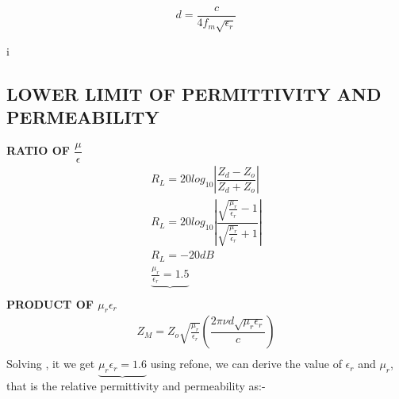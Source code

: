 \documentclass[journal]{IEEEtran}
\begin{document}
\begin{equation} \label{nine}
d  = \dfrac{c}{4 f_m \sqrt{\epsilon_r}} 
\end{equation}

i%


\subsection{LOWER LIMIT OF  PERMITTIVITY AND PERMEABILITY}

\textbf{RATIO OF $\dfrac{\mu}{\epsilon}$}
\begin{align}
R_L = 20 log_{10} |\dfrac{Z_d - Z_o}{Z_d + Z_o}| \\
R_L = 20 log_{10} \left \lvert \dfrac{\sqrt{\frac{\mu_r}{\epsilon_r}} - 1}{\sqrt{\frac{\mu_r}{\epsilon_r}} +1 } \right \rvert  \\
R_L = -20 dB \\
\underbrace{\frac{\mu_r}{\epsilon_r} = 1.5 }\\
\end{align}
\textbf{PRODUCT OF $\mu_r \epsilon_r$}
\begin{align}
Z_M = Z_o  \sqrt{\frac{\mu_r}{\epsilon_r}} (\dfrac{2 \pi \nu d \sqrt{\mu_r \epsilon_r}}{c}) \\
\end{align}
Solving , it we get 
$\underbrace{\mu_r \epsilon_r = 1.6}$
using ref{one}, we can derive the value of $\epsilon_r$ and $\mu_r$, that is the relative permittivity and permeability as:-

\end{document}
